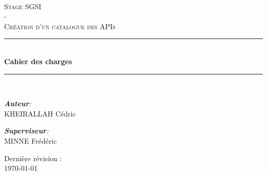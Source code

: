 \begin{titlepage}

    \newcommand{\HRule}{\rule{\linewidth}{0.5mm}} %
    \center 
     
    \vspace*{0.8cm}
    \\[1cm]
    
    \textsc{\Large Stage SGSI\\ - \\ \bigskip Création d'un catalogue des APIs}\\[1.5cm] %
    
    \HRule \\[0.8cm]
    
    {\huge \bfseries Cahier des charges}\\[0.7cm] %
    
    \HRule \\[1.5cm]
    
    
    \large
    

    \emph{\textbf{Auteur}:}\\
    KHEIRALLAH Cédric\\

    \vspace{1cm}

    \emph{\textbf{Superviseur}:}\\
    MINNE Frédéric\\

    \vfill
    
    Dernière révision : \\
    \large \today
    
\end{titlepage}